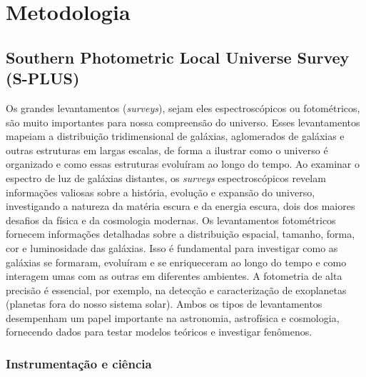 \chapter{Metodologia}
\label{chap:metodologia}

\section{Southern Photometric Local Universe Survey (S-PLUS)}
\label{sec:splus}

Os grandes levantamentos (\emph{surveys}), sejam eles espectroscópicos ou fotométricos, são muito importantes para nossa compreensão do universo. Esses levantamentos mapeiam a distribuição tridimensional de galáxias, aglomerados de galáxias e outras estruturas em largas escalas, de forma a ilustrar como o universo é organizado e como essas estruturas evoluíram ao longo do tempo. Ao examinar o espectro de luz de galáxias distantes, os \emph{surveys} espectroscópicos revelam informações valiosas sobre a história, evolução e expansão do universo, investigando a natureza da matéria escura e da energia escura, dois dos maiores desafios da física e da cosmologia modernas. Os levantamentos fotométricos fornecem informações detalhadas sobre a distribuição espacial, tamanho, forma, cor e luminosidade das galáxias. Isso é fundamental para investigar como as galáxias se formaram, evoluíram e se enriqueceram ao longo do tempo e como interagem umas com as outras em diferentes ambientes. A fotometria de alta precisão é essencial, por exemplo, na detecção e caracterização de exoplanetas (planetas fora do nosso sistema solar). Ambos os tipos de levantamentos desempenham um papel importante na astronomia, astrofísica e cosmologia, fornecendo dados para testar modelos teóricos e investigar fenômenos. 

\subsection{Instrumentação e ciência}

